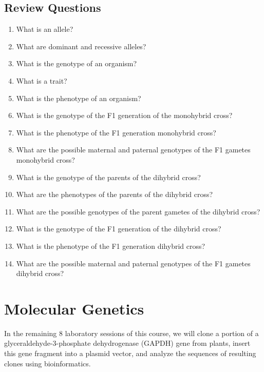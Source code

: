 \documentclass[]{book}
\providecommand{\tightlist}{%
  \setlength{\itemsep}{0pt}\setlength{\parskip}{0pt}}
\begin{document}
\hypertarget{review-questions-3}{%
\section{Review Questions}\label{review-questions-3}}

\begin{enumerate}
\def\labelenumi{\arabic{enumi}.}
\setcounter{enumi}{1}
\tightlist
\item
  What is an allele?
\item
  What are dominant and recessive alleles?
\item
  What is the genotype of an organism?
\item
  What is a trait?
\item
  What is the phenotype of an organism?
\item
  What is the genotype of the F1 generation of the monohybrid cross?
\item
  What is the phenotype of the F1 generation monohybrid cross?
\item
  What are the possible maternal and paternal genotypes of the F1 gametes monohybrid cross?
\item
  What is the genotype of the parents of the dihybrid cross?
\item
  What are the phenotypes of the parents of the dihybrid cross?
\item
  What are the possible genotypes of the parent gametes of the dihybrid cross?
\item
  What is the genotype of the F1 generation of the dihybrid cross?
\item
  What is the phenotype of the F1 generation dihybrid cross?
\item
  What are the possible maternal and paternal genotypes of the F1 gametes dihybrid cross?
\end{enumerate}

\hypertarget{molecular-genetics}{%
\chapter*{Molecular Genetics}\label{molecular-genetics}}

In the remaining 8 laboratory sessions of this course, we will clone a portion of a glyceraldehyde-3-phosphate dehydrogenase (GAPDH) gene from plants, insert this gene fragment into a plasmid vector, and analyze the sequences of resulting clones using bioinformatics.
\end{document}
